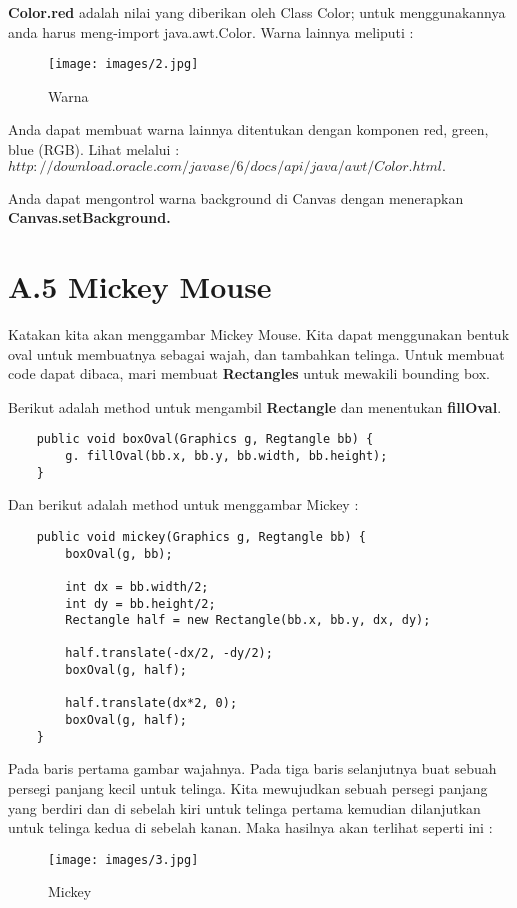 \textbf{Color.red} adalah nilai yang diberikan oleh Class Color; untuk menggunakannya anda harus meng-import java.awt.Color. Warna lainnya meliputi :
\begin{figure}[H]
	\centering \texttt{[image: images/2.jpg]}
	\caption{Warna}
	\label{fig:binaryTreeRekursif}
\end{figure}
Anda dapat membuat warna lainnya ditentukan dengan komponen red, green, blue (RGB). Lihat melalui : $http://download.oracle.com/javase/6/docs/api/java/awt/Color.html.$

Anda dapat mengontrol warna background di Canvas dengan menerapkan \textbf{Canvas.setBackground.}

\section{A.5 Mickey Mouse}
Katakan kita akan menggambar Mickey Mouse. Kita dapat menggunakan bentuk oval untuk membuatnya sebagai wajah, dan tambahkan telinga. Untuk membuat code dapat dibaca, mari membuat \textbf{Rectangles} untuk mewakili bounding box.

Berikut adalah method untuk mengambil \textbf{Rectangle} dan menentukan \textbf{fillOval}.

\begin{lstlisting}
	public void boxOval(Graphics g, Regtangle bb) {
		g. fillOval(bb.x, bb.y, bb.width, bb.height);
	}
\end{lstlisting}

Dan berikut adalah method untuk menggambar Mickey :
\begin{lstlisting}
	public void mickey(Graphics g, Regtangle bb) {
		boxOval(g, bb);
		
		int dx = bb.width/2;
		int dy = bb.height/2;
		Rectangle half = new Rectangle(bb.x, bb.y, dx, dy);
		
		half.translate(-dx/2, -dy/2);
		boxOval(g, half);
		
		half.translate(dx*2, 0);
		boxOval(g, half);
	}
\end{lstlisting}

Pada baris pertama gambar wajahnya. Pada tiga baris selanjutnya buat sebuah persegi panjang kecil untuk telinga. Kita mewujudkan sebuah persegi panjang yang berdiri dan di sebelah kiri untuk telinga pertama kemudian dilanjutkan untuk telinga kedua di sebelah kanan.
Maka hasilnya akan terlihat seperti ini :
\begin{figure}[H]
	\centering \texttt{[image: images/3.jpg]}
	\caption{Mickey}
	\label{fig:binaryTreeRekursif}
\end{figure}

